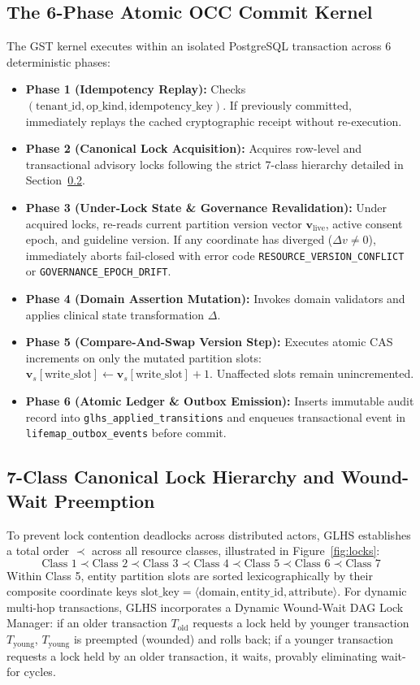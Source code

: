 \documentclass[11pt,a4paper]{article}
\begin{document}
\subsection{The 6-Phase Atomic OCC Commit Kernel}
The GST kernel executes within an isolated PostgreSQL transaction across 6 deterministic phases:
\begin{itemize}[leftmargin=1.8em]
  \item \textbf{Phase 1 (Idempotency Replay):} Checks $(\text{tenant\_id}, \text{op\_kind}, \text{idempotency\_key})$. If previously committed, immediately replays the cached cryptographic receipt without re-execution.
  \item \textbf{Phase 2 (Canonical Lock Acquisition):} Acquires row-level and transactional advisory locks following the strict 7-class hierarchy detailed in Section~\ref{sec:locking}.
  \item \textbf{Phase 3 (Under-Lock State \& Governance Revalidation):} Under acquired locks, re-reads current partition version vector $\mathbf{v}_{\text{live}}$, active consent epoch, and guideline version. If any coordinate has diverged ($\Delta v \neq 0$), immediately aborts fail-closed with error code \texttt{RESOURCE\_VERSION\_CONFLICT} or \texttt{GOVERNANCE\_EPOCH\_DRIFT}.
  \item \textbf{Phase 4 (Domain Assertion Mutation):} Invokes domain validators and applies clinical state transformation $\Delta$.
  \item \textbf{Phase 5 (Compare-And-Swap Version Step):} Executes atomic CAS increments on only the mutated partition slots: $\mathbf{v}_{s}[\text{write\_slot}] \leftarrow \mathbf{v}_{s}[\text{write\_slot}] + 1$. Unaffected slots remain unincremented.
  \item \textbf{Phase 6 (Atomic Ledger \& Outbox Emission):} Inserts immutable audit record into \texttt{glhs\_applied\_transitions} and enqueues transactional event in \texttt{lifemap\_outbox\_events} before commit.
\end{itemize}

\subsection{7-Class Canonical Lock Hierarchy and Wound-Wait Preemption}
\label{sec:locking}
To prevent lock contention deadlocks across distributed actors, GLHS establishes a total order $\prec$ across all resource classes, illustrated in Figure~\ref{fig:locks}:
$$\text{Class 1} \prec \text{Class 2} \prec \text{Class 3} \prec \text{Class 4} \prec \text{Class 5} \prec \text{Class 6} \prec \text{Class 7}$$
Within Class 5, entity partition slots are sorted lexicographically by their composite coordinate keys $\text{slot\_key} = \langle \text{domain}, \text{entity\_id}, \text{attribute} \rangle$. For dynamic multi-hop transactions, GLHS incorporates a Dynamic Wound-Wait DAG Lock Manager: if an older transaction $T_{\text{old}}$ requests a lock held by younger transaction $T_{\text{young}}$, $T_{\text{young}}$ is preempted (wounded) and rolls back; if a younger transaction requests a lock held by an older transaction, it waits, provably eliminating wait-for cycles.
\end{document}
